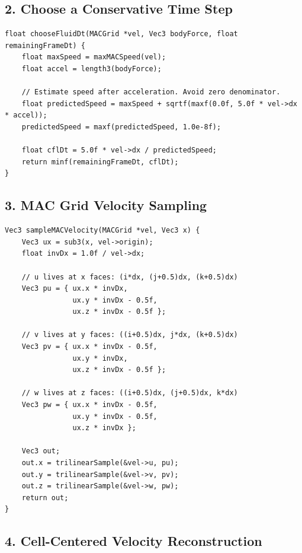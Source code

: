 \documentclass[10pt,letterpaper]{article}
\begin{document}
\subsection*{2. Choose a Conservative Time Step}

\begin{verbatim}
float chooseFluidDt(MACGrid *vel, Vec3 bodyForce, float remainingFrameDt) {
    float maxSpeed = maxMACSpeed(vel);
    float accel = length3(bodyForce);

    // Estimate speed after acceleration. Avoid zero denominator.
    float predictedSpeed = maxSpeed + sqrtf(maxf(0.0f, 5.0f * vel->dx * accel));
    predictedSpeed = maxf(predictedSpeed, 1.0e-8f);

    float cflDt = 5.0f * vel->dx / predictedSpeed;
    return minf(remainingFrameDt, cflDt);
}
\end{verbatim}

\subsection*{3. MAC Grid Velocity Sampling}

\begin{verbatim}
Vec3 sampleMACVelocity(MACGrid *vel, Vec3 x) {
    Vec3 ux = sub3(x, vel->origin);
    float invDx = 1.0f / vel->dx;

    // u lives at x faces: (i*dx, (j+0.5)dx, (k+0.5)dx)
    Vec3 pu = { ux.x * invDx,
                ux.y * invDx - 0.5f,
                ux.z * invDx - 0.5f };

    // v lives at y faces: ((i+0.5)dx, j*dx, (k+0.5)dx)
    Vec3 pv = { ux.x * invDx - 0.5f,
                ux.y * invDx,
                ux.z * invDx - 0.5f };

    // w lives at z faces: ((i+0.5)dx, (j+0.5)dx, k*dx)
    Vec3 pw = { ux.x * invDx - 0.5f,
                ux.y * invDx - 0.5f,
                ux.z * invDx };

    Vec3 out;
    out.x = trilinearSample(&vel->u, pu);
    out.y = trilinearSample(&vel->v, pv);
    out.z = trilinearSample(&vel->w, pw);
    return out;
}
\end{verbatim}

\subsection*{4. Cell-Centered Velocity Reconstruction}
\end{document}
